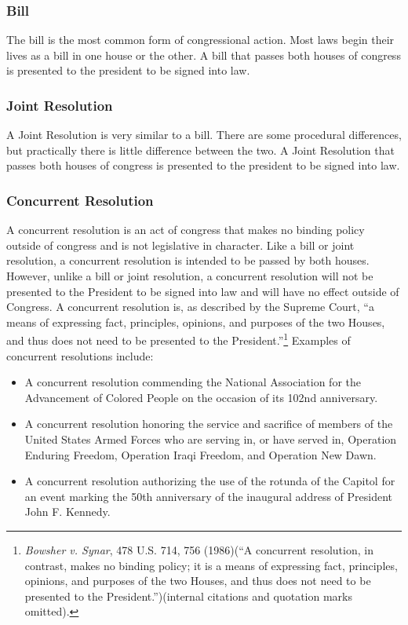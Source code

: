 \subsubsection{Bill}
The bill is the most common form of congressional action.  
Most laws begin their lives as a bill in one house or the other.
A bill that passes both houses of congress is presented to the president to be signed into law.

\subsubsection{Joint Resolution}
A Joint Resolution is very similar to a bill.
There are some procedural differences, but practically there is little difference between the two.
A Joint Resolution that passes both houses of congress is presented to the president to be signed into law.

\subsubsection{Concurrent Resolution}
A concurrent resolution is an act of congress that makes no binding policy outside of congress and is not legislative in character.  
Like a bill or joint resolution, a concurrent resolution is intended to be passed by both houses.
However, unlike a bill or joint resolution, a concurrent resolution will not be presented to the President to be signed into law and will have no effect outside of Congress.
A concurrent resolution is, as described by the Supreme Court, ``a means of expressing fact, principles, opinions, and purposes of the two Houses, and thus does not need to be presented to the President.''\footnote{\textit{Bowsher v. Synar}, 478 U.S. 714, 756 (1986)(``A concurrent resolution, in contrast, makes no binding policy; it is a means of expressing fact, principles, opinions, and purposes of the two Houses, and thus does not need to be presented to the President.'')(internal citations and quotation marks omitted).}
Examples of concurrent resolutions include: 
\begin{itemize}
\item A concurrent resolution commending the National Association for the Advancement of Colored People on the occasion of its 102nd anniversary.
\item A concurrent resolution honoring the service and sacrifice of members of the United States Armed Forces who are serving in, or have served in, Operation Enduring Freedom, Operation Iraqi Freedom, and Operation New Dawn.
\item  A concurrent resolution authorizing the use of the rotunda of the Capitol for an event marking the 50th anniversary of the inaugural address of President John F. Kennedy.
\end{itemize}

